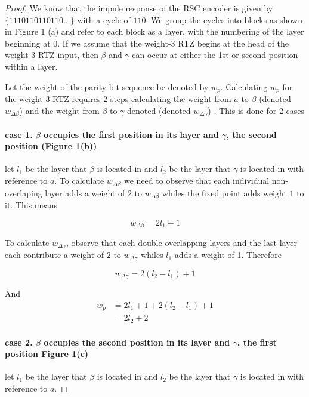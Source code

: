 \documentclass[fontsize=12pt]{article}
\theoremstyle{definition}
\begin{document}
\begin{proof}
We know that the impule response of the RSC encoder is given by $\{1 1 1 0 1 1 0 1 1 0 1 1 0...\}$ with a cycle of $1 1 0$. We group the cycles into blocks as shown in Figure 1 (a)  and refer to each block as a layer, with the numbering of the layer beginning at $0$. If we assume that the weight-$3$ RTZ begins at the head of the weight-$3$ RTZ input, then $\beta$ and $\gamma$ can occur at either the 1st or second position within a layer. %

Let the weight of the parity bit sequence be denoted by $w_p$. Calculating $w_p$ for the weight-$3$ RTZ requires 2 steps calculating the weight from $a$ to $\beta$ (denoted $w_{\Delta \beta}$) and the weight from $\beta$ to $\gamma$ denoted (denoted $w_{\Delta \gamma}$) . This is done for 2 cases

\paragraph {case 1. $\beta$ occupies the first position in its layer and $\gamma$, the second position (Figure 1(b))\newline}
let $l_1$ be the layer that $\beta$ is located in and $l_2$ be the layer that $\gamma$ is located in with reference to $a$.
To calculate $w_{\Delta \beta}$ we need to observe that each individual non-overlaping layer adds a weight of $2$ to $w_{\Delta \beta}$ whiles the fixed point adds weight $1$ to it. This means

$$w_{\Delta \beta} = 2l_1+1$$

To calculate $w_{\Delta \gamma}$, observe that each double-overlapping layers and the last layer each contribute  a weight of $2$ to $w_{\Delta \gamma}$ whiles $l_1$ adds a weight of 1. Therefore

$$w_{\Delta \gamma} = 2(l_2-l_1)+1$$

And 
\begin{equation}
\begin{split}
w_p&=2l_1+1 + 2(l_2-l_1)+1\\
&=2l_2+2
\end{split}
\end{equation}

\paragraph {case 2. $\beta$ occupies the second position in its layer and $\gamma$, the first position Figure 1(c) \newline}
let $l_1$ be the layer that $\beta$ is located in and $l_2$ be the layer that $\gamma$ is located in with reference to $a$.


\end{proof}
\end{document}
